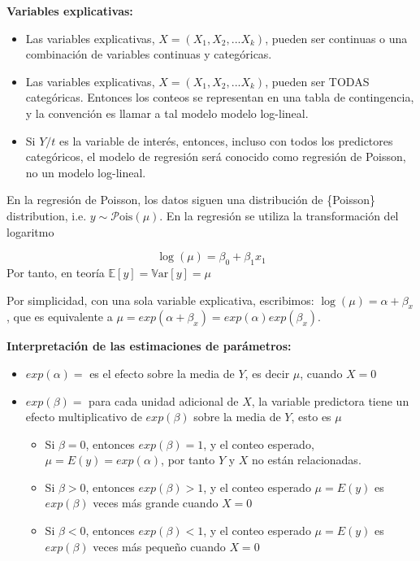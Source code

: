 \documentclass[]{article}
\numberwithin{equation}{section}
\begin{document}
\textbf{Variables explicativas:}

\begin{itemize}
\item
  Las variables explicativas, \(X = (X_1, X_2, ... X_k)\), pueden ser
  continuas o una combinación de variables continuas y categóricas.
\item
  Las variables explicativas, \(X = (X_1, X_2, ... X_k)\), pueden ser
  TODAS categóricas. Entonces los conteos se representan en una tabla de
  contingencia, y la convención es llamar a tal modelo modelo
  log-lineal.
\item
  Si \(Y/t\) es la variable de interés, entonces, incluso con todos los
  predictores categóricos, el modelo de regresión será conocido como
  regresión de Poisson, no un modelo log-lineal.
\end{itemize}

En la regresión de Poisson, los datos siguen una distribución de
\{Poisson\} distribution, i.e. \(y \sim \mathcal{P}\mbox{ois}(\mu)\). En
la regresión se utiliza la transformación del logaritmo

\[
\log(\mu)=\beta_0+\beta_1x_1
\] Por tanto, en teoría \(\mathbb{E}[y] = \mathbb{V}\mbox{ar}[y] = \mu\)

Por simplicidad, con una sola variable explicativa, escribimos:
\(\log(\mu)=\alpha + \beta_x\), que es equivalente a
\(\mu=exp(\alpha+\beta_x)=exp(\alpha)exp(\beta_x)\).

\textbf{Interpretación de las estimaciones de parámetros:}

\begin{itemize}
\item
  \(exp(\alpha) =\) es el efecto sobre la media de \(Y\), es decir
  \(\mu\), cuando \(X = 0\)
\item
  \(exp(\beta) =\) para cada unidad adicional de \(X\), la variable
  predictora tiene un efecto multiplicativo de \(exp(\beta)\) sobre la
  media de \(Y\), esto es \(\mu\)

  \begin{itemize}
  \item
    Si \(\beta = 0\), entonces \(exp(\beta) = 1\), y el conteo esperado,
    \(\mu = E(y) = exp(\alpha)\), por tanto \(Y\) y \(X\) no están
    relacionadas.
  \item
    Si \(\beta > 0\), entonces \(exp(\beta) > 1\), y el conteo esperado
    \(\mu = E(y)\) es \(exp(\beta)\) veces más grande cuando \(X = 0\)
  \item
    Si \(\beta < 0\), entonces \(exp(\beta) < 1\), y el conteo esperado
    \(\mu = E(y)\) es \(exp(\beta)\) veces más pequeño cuando \(X = 0\)
  \end{itemize}
\end{itemize}
\end{document}
